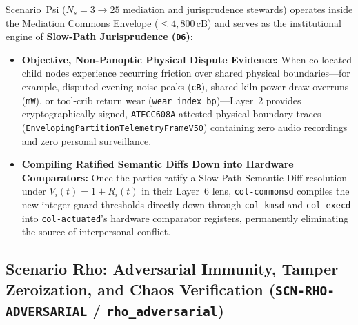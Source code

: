Scenario~Psi ($N_s = 3 \to 25$ mediation and jurisprudence stewards) operates inside the Mediation Commons Envelope ($\le 4{,}800\,\mathrm{cB}$) and serves as the institutional engine of \textbf{Slow-Path Jurisprudence (\texttt{D6})}:
\begin{itemize}
    \item \textbf{Objective, Non-Panoptic Physical Dispute Evidence:} When co-located child nodes experience recurring friction over shared physical boundaries---for example, disputed evening noise peaks (\texttt{cB}), shared kiln power draw overruns (\texttt{mW}), or tool-crib return wear (\texttt{wear\_index\_bp})---Layer~2 provides cryptographically signed, \texttt{ATECC608A}-attested physical boundary traces (\texttt{EnvelopingPartitionTelemetryFrameV50}) containing zero audio recordings and zero personal surveillance.
    \item \textbf{Compiling Ratified Semantic Diffs Down into Hardware Comparators:} Once the parties ratify a Slow-Path Semantic Diff resolution under $V_i(t) = 1 + R_i(t)$ in their Layer~6 lens, \texttt{col-commonsd} compiles the new integer guard thresholds directly down through \texttt{col-kmsd} and \texttt{col-execd} into \texttt{col-actuated}'s hardware comparator registers, permanently eliminating the source of interpersonal conflict.
\end{itemize}

\subsection{Scenario Rho: Adversarial Immunity, Tamper Zeroization, and Chaos Verification (\texttt{SCN-RHO-ADVERSARIAL} / \texttt{rho\_adversarial})}

